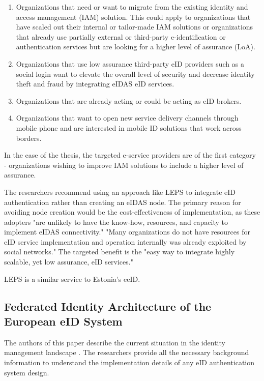 \begin{enumerate}
    \item Organizations that need or want to migrate from the existing identity and access management (IAM) solution. This could apply to organizations that have scaled out their internal or tailor-made IAM solutions or organizations that already use partially external or third-party e-identification or authentication services but are looking for a higher level of assurance (LoA).
    \item Organizations that use low assurance third-party eID providers such as a social login want to elevate the overall level of security and decrease identity theft and fraud by integrating eIDAS eID services.
    \item Organizations that are already acting or could be acting as eID brokers.
    \item Organizations that want to open new service delivery channels through mobile phone and are interested in mobile ID solutions that work across borders.
\end{enumerate}

In the case of the thesis, the targeted e-service providers are of the first category - organizations wishing to improve IAM solutions to include a higher level of assurance.

The researchers recommend using an approach like LEPS to integrate eID authentication rather than creating an eIDAS node. The primary reason for avoiding node creation would be the cost-effectiveness of implementation, as these adopters "are unlikely to have the know-how, resources, and capacity to implement eIDAS connectivity." "Many organizations do not have resources for eID service implementation and operation internally was already exploited by social networks." The targeted benefit is the "easy way to integrate highly scalable, yet low assurance, eID services."

LEPS is a similar service to Estonia's eeID.

\subsection{Federated Identity Architecture of the European eID System}

The authors of this paper describe the current situation in the identity management landscape \cite{federated-europe-identity}. The researchers provide all the necessary background information to understand the implementation details of any eID authentication system design.

